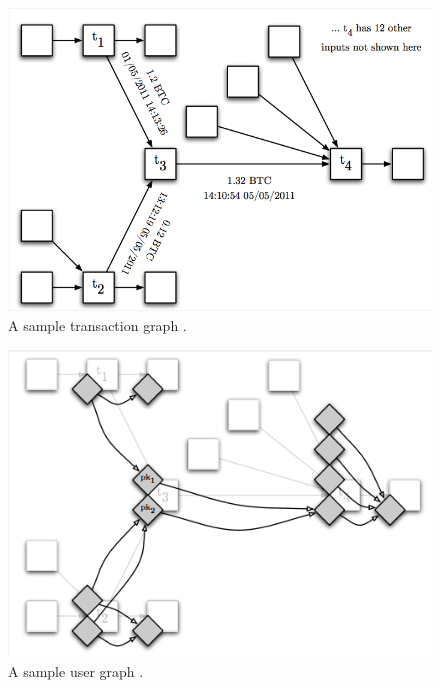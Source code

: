 \begin{figure}
\begin{center}
\includegraphics[scale=0.35]{images/transaction_graph.png}
\caption{A sample transaction graph \protect\cite{ReidHarrigan13}.}
\label{fig:transaction-graph}
\end{center}
\end{figure}

\begin{figure}
\begin{center}
\includegraphics[scale=0.45]{images/transaction_user_graph.png}
\caption{A sample user graph \protect\cite{ReidHarrigan13}.}
\label{fig:user-graph}
\end{center}
\end{figure}

